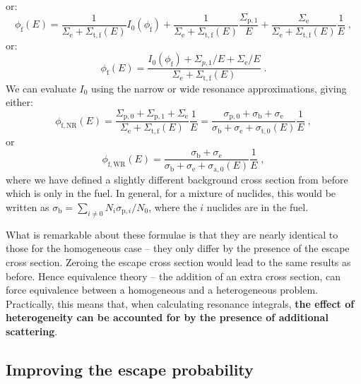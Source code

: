 or:
\begin{equation*}
    \phi_\mathrm{f}(E) = \frac{1}{\Sigma_\mathrm{e} + \Sigma_{\mathrm{t,f}}(E)}I_0(\phi_\mathrm{f}) + \frac{1}{\Sigma_\mathrm{e} + \Sigma_{\mathrm{t,f}}(E)}\frac{\Sigma_{\mathrm{p},1}}{E} + \frac{\Sigma_\mathrm{e}}{\Sigma_\mathrm{e} + \Sigma_{\mathrm{t,f}}(E)}\frac{1}{E}\;\mathrm{,}
\end{equation*}
or:
\begin{equation*}
    \phi_\mathrm{f}(E) = \frac{I_0(\phi_\mathrm{f}) + \Sigma_{p,1}/E + \Sigma_\mathrm{e}/E}{\Sigma_\mathrm{e} + \Sigma_{\mathrm{t,f}}(E)}\;\mathrm{.}
\end{equation*}
We can evaluate $I_0$ using the narrow or wide resonance approximations, giving either:
\begin{equation*}
    \phi_\mathrm{f,NR}(E) = \frac{\Sigma_{\mathrm{p},0} + \Sigma_{\mathrm{p},1} + \Sigma_\mathrm{e}}{\Sigma_\mathrm{e} + \Sigma_{\mathrm{t,f}}(E)}\frac{1}{E} = \frac{\sigma_{\mathrm{p},0} + \sigma_\mathrm{b} + \sigma_\mathrm{e}}{\sigma_\mathrm{b} + \sigma_\mathrm{e} + \sigma_{\mathrm{t,0}}(E)}\frac{1}{E}\;\mathrm{,}
\end{equation*}
or
\begin{equation*}
    \phi_{\mathrm{f,WR}}(E) = \frac{\sigma_\mathrm{b}+\sigma_\mathrm{e}}{\sigma_\mathrm{b} + \sigma_\mathrm{e} + \sigma_\mathrm{a,0}(E)}\frac{1}{E}\;\mathrm{,}
\end{equation*}
where we have defined a slightly different background cross section from before which is only in the fuel. In general, for a mixture of nuclides, this would be written as $\sigma_\mathrm{b} = \sum_{i\neq 0}N_i\sigma_{\mathrm{p},i}/N_0$, where the $i$ nuclides are in the fuel.

What is remarkable about these formulae is that they are nearly identical to those for the homogeneous case -- they only differ by the presence of the escape cross section. Zeroing the escape cross section would lead to the same results as before. Hence equivalence theory -- the addition of an extra cross section, can force equivalence between a homogeneous and a heterogeneous problem. Practically, this means that, when calculating resonance integrals, \textbf{the effect of heterogeneity can be accounted for by the presence of additional scattering}.

\subsection{Improving the escape probability}

